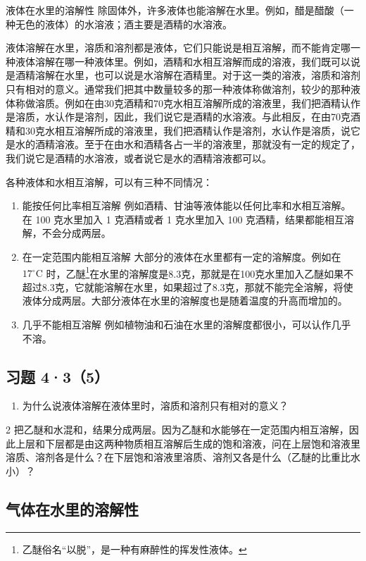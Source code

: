 液体在水里的溶解性
除固体外，许多液体也能溶解在水里。例如，醋是醋酸（一种无色的液体）的水溶液；酒主要是酒精的水溶液。

液体溶解在水里，溶质和溶剂都是液体，它们只能说是相互溶解，而不能肯定哪一种液体溶解在哪一种液体里。例如，酒精和水相互溶解而成的溶液，我们既可以说是酒精溶解在水里，也可以说是水溶解在酒精里。对于这一类的溶液，溶质和溶剂只有相对的意义。通常我们把其中数量较多的那一种液体称做溶剂，较少的那种液体称做溶质。例如在由30克酒精和70克水相互溶解所成的溶液里，我们把酒精认作是溶质，水认作是溶剂，因此，我们说它是酒精的水溶液。与此相反，在由70克酒精和30克水相互溶解所成的溶液里，我们把酒精认作是溶剂，水认作是溶质，说它是水的酒精溶液。至于在由水和酒精各占一半的溶液里，那就没有一定的规定了，我们说它是酒精的水溶液，或者说它是水的酒精溶液都可以。

各种液体和水相互溶解，可以有三种不同情况：

\begin{enumerate}
\item
  能按任何比率相互溶解 例如酒精、甘油等液体能以任何比率和水相互溶解。在
  100 克水里加入 1 克酒精或者 1 克水里加入 100
  克酒精，结果都能相互溶解，不会分成两层。
\item
  在一定范围内能相互溶解 大部分的液体在水里都有一定的溶解度。例如在
  \(17^{\circ} \mathrm{C}\)
  时，乙醚\footnote{乙醚俗名``以脱''，是一种有麻醉性的挥发性液体。}在水里的溶解度是8.3克，那就是在100克水里加入乙醚如果不超过8.3克，它就能溶解在水里，如果超过了8.3克，那就不能完全溶解，将使液体分成两层。大部分液体在水里的溶解度也是随着温度的升高而增加的。
\item
  几乎不能相互溶解
  例如植物油和石油在水里的溶解度都很小，可以认作几乎不溶。
\end{enumerate}

\subsection{习题 4·3（5）}

\begin{enumerate}
\item
  为什么说液体溶解在液体里时，溶质和溶剂只有相对的意义？
\end{enumerate}

2
把乙醚和水混和，结果分成两层。因为乙醚和水能够在一定范围内相互溶解，因此上层和下层都是由这两种物质相互溶解后生成的饱和溶液，问在上层饱和溶液里溶质、溶剂各是什么？在下层饱和溶液里溶质、溶剂又各是什么（乙醚的比重比水小）？

\subsection{气体在水里的溶解性}

